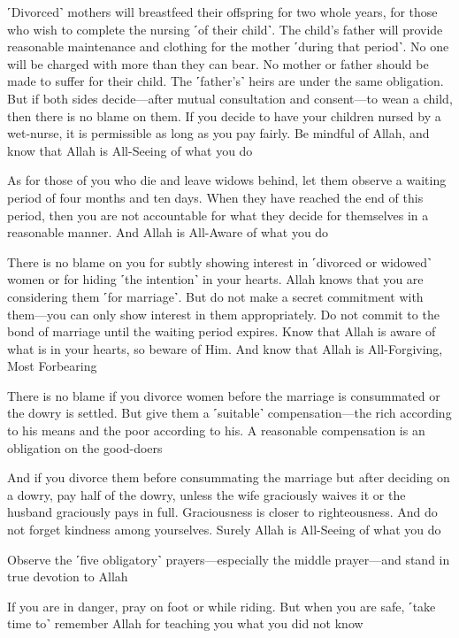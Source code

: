 ˹Divorced˺ mothers will breastfeed their offspring for two whole years, for those who wish to complete the nursing ˹of their child˺. The child’s father will provide reasonable maintenance and clothing for the mother ˹during that period˺. No one will be charged with more than they can bear. No mother or father should be made to suffer for their child. The ˹father’s˺ heirs are under the same obligation. But if both sides decide—after mutual consultation and consent—to wean a child, then there is no blame on them. If you decide to have your children nursed by a wet-nurse, it is permissible as long as you pay fairly. Be mindful of Allah, and know that Allah is All-Seeing of what you do

As for those of you who die and leave widows behind, let them observe a waiting period of four months and ten days. When they have reached the end of this period, then you are not accountable for what they decide for themselves in a reasonable manner. And Allah is All-Aware of what you do

There is no blame on you for subtly showing interest in ˹divorced or widowed˺ women or for hiding ˹the intention˺ in your hearts. Allah knows that you are considering them ˹for marriage˺. But do not make a secret commitment with them—you can only show interest in them appropriately. Do not commit to the bond of marriage until the waiting period expires. Know that Allah is aware of what is in your hearts, so beware of Him. And know that Allah is All-Forgiving, Most Forbearing

There is no blame if you divorce women before the marriage is consummated or the dowry is settled. But give them a ˹suitable˺ compensation—the rich according to his means and the poor according to his. A reasonable compensation is an obligation on the good-doers

And if you divorce them before consummating the marriage but after deciding on a dowry, pay half of the dowry, unless the wife graciously waives it or the husband graciously pays in full. Graciousness is closer to righteousness. And do not forget kindness among yourselves. Surely Allah is All-Seeing of what you do

Observe the ˹five obligatory˺ prayers—especially the middle prayer—and stand in true devotion to Allah

If you are in danger, pray on foot or while riding. But when you are safe, ˹take time to˺ remember Allah for teaching you what you did not know

